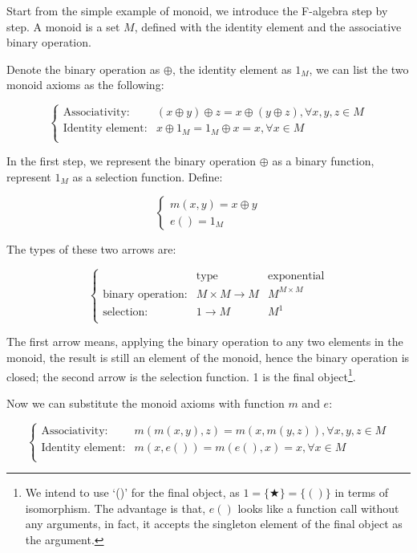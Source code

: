 \documentclass{article}
\begin{document}
\begin{example}
\normalfont
Start from the simple example of monoid, we introduce the F-algebra step by step. A monoid is a set $M$, defined with the identity element and the associative binary operation.

Denote the binary operation as $\oplus$, the identity element as $1_M$, we can list the two monoid axioms as the following:

\[
\begin{cases}
\text{Associativity:} & (x \oplus y) \oplus z = x \oplus (y \oplus z), \forall x, y, z \in M \\
\text{Identity element:} & x \oplus 1_M = 1_M \oplus x = x, \forall x \in M \\
\end{cases}
\]

In the first step, we represent the binary operation $\oplus$ as a binary function, represent $1_M$ as a selection function. Define:

\[
\begin{cases}
m (x, y) = x \oplus y \\
e () = 1_M
\end{cases}
\]

The types of these two arrows are:

\[
\left \{
\begin{array}{lll}
 & \text{type} & \text{exponential} \\
\text{binary operation:} & M \times M \to M & M^{M \times M}\\
\text{selection:} & 1 \to M & M^1 \\
\end{array}
\right .
\]

The first arrow means, applying the binary operation to any two elements in the monoid, the result is still an element of the monoid, hence the binary operation is closed; the second arrow is the selection function. 1 is the final object\footnote{We intend to use `()' for the final object, as $1 = \{ \bigstar \} = \{ () \}$ in terms of isomorphism. The advantage is that, $e()$ looks like a function call without any arguments, in fact, it accepts the singleton element of the final object as the argument.}.

Now we can substitute the monoid axioms with function $m$ and $e$:

\[
\begin{cases}
\text{Associativity:} & m(m(x, y), z) = m(x, m(y, z)), \forall x, y, z \in M \\
\text{Identity element:} & m(x, e()) = m(e(), x) = x, \forall x \in M \\
\end{cases}
\]


\end{example}
\end{document}
